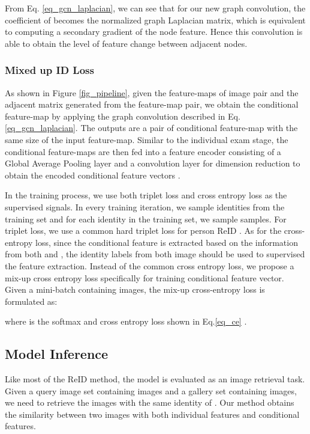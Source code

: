 \documentclass[final]{cvpr}
\begin{document}
From Eq. \ref{eq_gcn_laplacian},  we can see that for our new graph convolution, the coefficient of  becomes the normalized graph Laplacian matrix, which is equivalent to computing a secondary gradient of the node feature. Hence this convolution is able to obtain the level of feature change between adjacent nodes. 

\subsubsection{Mixed up ID Loss}
As shown in Figure \ref{fig_pipeline}, given the feature-maps of image pair  and the adjacent matrix  generated from the feature-map pair, we obtain the conditional feature-map by applying the graph convolution described in Eq. \ref{eq_gcn_laplacian}. The outputs are a pair of conditional feature-map with the same size of the input feature-map. Similar to the individual exam stage, the conditional feature-maps are then fed into a feature encoder consisting of a Global Average Pooling layer and a  convolution layer for dimension reduction to obtain the encoded conditional feature vectors . 

In the training process, we use both triplet loss and cross entropy loss as the supervised signals. In every training iteration, we sample  identities from the training set and for each identity in the training set, we sample  samples. For triplet loss, we use a common hard triplet loss for person ReID \cite{hermans2017defense}.
As for the cross-entropy loss, since the conditional feature  is extracted based on the information from both  and , the identity labels from both image should be used to supervised the feature extraction. Instead of the common cross entropy loss, we propose a mix-up cross entropy loss specifically for training conditional feature vector. Given a mini-batch containing  images, the mix-up cross-entropy loss is formulated as:

where  is the softmax and cross entropy loss shown in Eq.\ref{eq_ce} . 

\subsection{Model Inference}
Like most of the ReID method, the model is evaluated as an image retrieval task. Given a query image set containing  images and a gallery set containing  images,  
we need to retrieve the images with the same identity of . Our method obtains the similarity between two images with both individual features and conditional features.  
\end{document}
